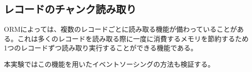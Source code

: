 \documentclass[../../../main]{subfiles}
\begin{document}
    \subsection{レコードのチャンク読み取り}\label{subsec:phraseology-record_chunk_read}

    ORMによっては、複数のレコードごとに読み取る機能が備わっていることがある。これは多くのレコードを読み取る際に一度に消費するメモリを節約するため1つのレコードずつ読み取り実行することができる機能である。

    本実験ではこの機能を用いたイベントソーシングの方法も検証する。
\end{document}
